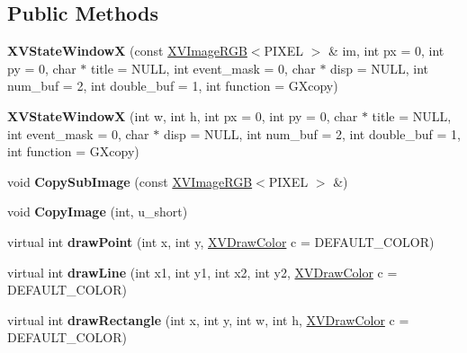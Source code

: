 \subsection*{Public Methods}
\begin{CompactItemize}
\item 
{\bf XVState\-Window\-X} (const \hyperlink{class_XVImageRGB}{XVImage\-RGB}$<$PIXEL $>$ \& im, int px = 0, int py = 0, char $\ast$ title = NULL, int event\_\-mask = 0, char $\ast$ disp = NULL, int num\_\-buf = 2, int double\_\-buf = 1, int function = GXcopy)
\item 
{\bf XVState\-Window\-X} (int w, int h, int px = 0, int py = 0, char $\ast$ title = NULL, int event\_\-mask = 0, char $\ast$ disp = NULL, int num\_\-buf = 2, int double\_\-buf = 1, int function = GXcopy)
\item 
\label{XVStateWindowX_a2}
\hypertarget{class_XVStateWindowX_a2}{
void {\bf Copy\-Sub\-Image} (const \hyperlink{class_XVImageRGB}{XVImage\-RGB}$<$PIXEL $>$ \&)}

\item 
\label{XVStateWindowX_a3}
\hypertarget{class_XVStateWindowX_a3}{
void {\bf Copy\-Image} (int, u\_\-short)}

\item 
\label{XVStateWindowX_a4}
\hypertarget{class_XVStateWindowX_a4}{
virtual int {\bf draw\-Point} (int x, int y, \hyperlink{class_XVDrawColor}{XVDraw\-Color} c = DEFAULT\_\-COLOR)}

\item 
\label{XVStateWindowX_a5}
\hypertarget{class_XVStateWindowX_a5}{
virtual int {\bf draw\-Line} (int x1, int y1, int x2, int y2, \hyperlink{class_XVDrawColor}{XVDraw\-Color} c = DEFAULT\_\-COLOR)}

\item 
\label{XVStateWindowX_a6}
\hypertarget{class_XVStateWindowX_a6}{
virtual int {\bf draw\-Rectangle} (int x, int y, int w, int h, \hyperlink{class_XVDrawColor}{XVDraw\-Color} c = DEFAULT\_\-COLOR)}


\end{CompactItemize}
